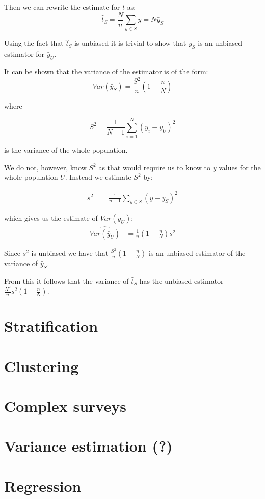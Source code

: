\documentclass{article}
\begin{document}
Then we can rewrite the estimate for $t$ as:
$$ \hat{t}_S = \frac{N}{n} \sum_{y \in S} y = N\bar{y}_S $$

Using the fact that $\hat{t}_S$ is unbiased it is trivial to show that
$\bar{y}_S$ is an unbiased estimator for $\bar{y}_U$.

It can be shown that the variance of the estimator is of the form:
$$ Var \left( \bar{y}_S \right) = \frac{S^2}{n} \left( 1 - \frac{n}{N}
\right) $$

where

$$
S^2 = \frac{1}{N - 1} \sum_{i = 1}^N (y_i - \bar{y}_U)^2
$$

is the variance of the whole population.

We do not, however, know $S^2$ as that would require us to know to $y$ values
for the whole population $U$. Instead we estimate $S^2$ by:

\begin{align*}
  s^2
  &= \frac{1}{n - 1} \sum_{y \in S} \left( y - \bar{y}_S \right)^2
\end{align*}

which gives us the estimate of $Var(\bar{y}_U)$:
\begin{align*}
  \widehat{Var(\bar{y}_U)}
  &= \frac{1}{n} \left( 1 - \frac{n}{N} \right) s^2
\end{align*}

Since $s^2$ is unbiased we have that $\frac{S^2}{n} \left( 1 - \frac{n}{N}
\right)$ is an unbiased estimator of the variance of $\bar{y}_S$.

From this it follows that the variance of $\hat{t}_S$ has the unbiased estimator
$\frac{N^2}{n} s^2 \left( 1 - \frac{n}{N} \right)$.

\section{Stratification}

\section{Clustering}

\section{Complex surveys}

\section{Variance estimation (?)}

\section{Regression}
\end{document}

